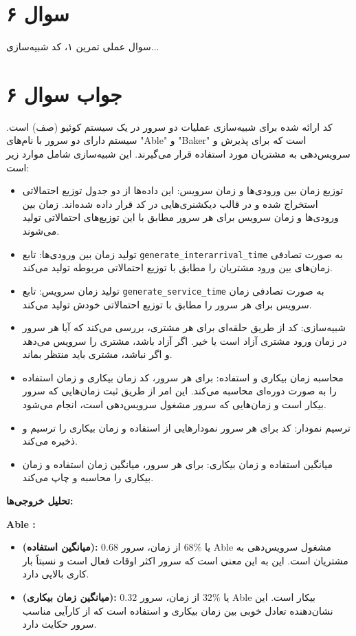 \section*{سوال ۶}

سوال عملی تمرین ۱، کد شبیه‌سازی...
\section*{جواب سوال ۶}

کد ارائه شده برای شبیه‌سازی عملیات دو سرور در یک سیستم کوئیو (صف) است. سیستم دارای دو سرور با نام‌های "Able" و "Baker" است که برای پذیرش و سرویس‌دهی به مشتریان مورد استفاده قرار می‌گیرند. این شبیه‌سازی شامل موارد زیر است:

\begin{itemize}
	\item توزیع زمان بین ورودی‌ها و زمان سرویس: این داده‌ها از دو جدول توزیع احتمالاتی استخراج شده و در قالب دیکشنری‌هایی در کد قرار داده شده‌اند. زمان بین ورودی‌ها و زمان سرویس برای هر سرور مطابق با این توزیع‌های احتمالاتی تولید می‌شوند.
	\item تولید زمان بین ورودی‌ها: تابع \texttt{generate\_interarrival\_time} به صورت تصادفی زمان‌های بین ورود مشتریان را مطابق با توزیع احتمالاتی مربوطه تولید می‌کند.
	\item تولید زمان سرویس: تابع \texttt{generate\_service\_time} به صورت تصادفی زمان سرویس برای هر سرور را مطابق با توزیع احتمالاتی خودش تولید می‌کند.
	\item شبیه‌سازی: کد از طریق حلقه‌ای برای هر مشتری، بررسی می‌کند که آیا هر سرور در زمان ورود مشتری آزاد است یا خیر. اگر آزاد باشد، مشتری را سرویس می‌دهد و اگر نباشد، مشتری باید منتظر بماند.
	\item محاسبه زمان بیکاری و استفاده: برای هر سرور، کد زمان بیکاری و زمان استفاده را به صورت دوره‌ای محاسبه می‌کند. این امر از طریق ثبت زمان‌هایی که سرور بیکار است و زمان‌هایی که سرور مشغول سرویس‌دهی است، انجام می‌شود.
	\item ترسیم نمودار: کد برای هر سرور نمودارهایی از استفاده و زمان بیکاری را ترسیم و ذخیره می‌کند.
	\item میانگین استفاده و زمان بیکاری: برای هر سرور، میانگین زمان استفاده و زمان بیکاری را محاسبه و چاپ می‌کند.
\end{itemize}

\textbf{تحلیل خروجی‌ها:}

\textbf{Able :}
\begin{itemize}
	\item \textbf{ (میانگین استفاده):} \(0.68\) یا \(68\%\) از زمان، سرور Able مشغول سرویس‌دهی به مشتریان است. این به این معنی است که سرور اکثر اوقات فعال است و نسبتاً بار کاری بالایی دارد.
	\item \textbf{ (میانگین زمان بیکاری):} \(0.32\) یا \(32\%\) از زمان، سرور Able بیکار است. این نشان‌دهنده تعادل خوبی بین زمان بیکاری و استفاده است که از کارآیی مناسب سرور حکایت دارد.
\end{itemize}


